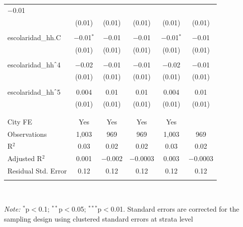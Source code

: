 \begin{table}[H]
\begin{tabularx}{0.9\textwidth}{@{\extracolsep{-7pt}}lccccc}
$-$0.01 \\    & (0.01) & (0.01) & (0.01) & (0.01) & (0.01) \\    & & & & & \\   escolaridad\_hh.C & $-$0.01$^{*}$ & $-$0.01 & $-$0.01 & $-$0.01$^{*}$ & $-$0.01 \\    & (0.01) & (0.01) & (0.01) & (0.01) & (0.01) \\    & & & & & \\   escolaridad\_hh$\hat{\mkern6mu}$4 & $-$0.02 & $-$0.01 & $-$0.01 & $-$0.02 & $-$0.01 \\    & (0.01) & (0.01) & (0.01) & (0.01) & (0.01) \\    & & & & & \\   escolaridad\_hh$\hat{\mkern6mu}$5 & 0.004 & 0.01 & 0.01 & 0.004 & 0.01 \\    & (0.01) & (0.01) & (0.01) & (0.01) & (0.01) \\    & & & & & \\  \hline \\[-1.8ex]  City FE & Yes & Yes & Yes & Yes &  \\  Observations & 1,003 & 969 & 969 & 1,003 & 969 \\  R$^{2}$ & 0.03 & 0.02 & 0.02 & 0.03 & 0.02 \\  Adjusted R$^{2}$ & 0.001 & $-$0.002 & $-$0.0003 & 0.003 & $-$0.0003 \\  Residual Std. Error & 0.12 & 0.12 & 0.12 & 0.12 & 0.12 \\  \hline  \hline \\[-1.8ex]  \end{tabularx} \\ \parbox[]{\textwidth}{\textit{Note:} $^{*}$p$<$0.1; $^{**}$p$<$0.05; $^{***}$p$<$0.01. Standard errors are corrected for the sampling design using clustered standard errors at strata level }  \end{table} 